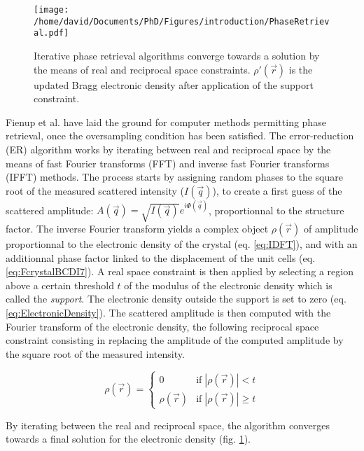 \begin{figure}[!htb]
   \centering
   \texttt{[image: /home/david/Documents/PhD/Figures/introduction/PhaseRetrieval.pdf]}
   \caption{
   Iterative phase retrieval algorithms converge towards a solution by the means of real and reciprocal space constraints.
   $\rho'(\vec{r})$ is the updated Bragg electronic density after application of the support constraint.
   }
   \label{fig:PRAlgo}
\end{figure}

Fienup et al. \parencite*{Fienup1978, Fienup1982, Fienup1986} have laid the ground for computer methods permitting phase retrieval, once the oversampling condition has been satisfied.
The error-reduction (ER) algorithm works by iterating between real and reciprocal space by the means of fast Fourier transforms (FFT) and inverse fast Fourier transforms (IFFT) methods.
The process starts by assigning random phases to the square root of the measured scattered intensity ($I(\vec{q})$), to create a first guess of the scattered amplitude: $A(\vec{q}) = \sqrt{I(\vec{q})}e^{i\Phi(\vec{q})}$, proportionnal to the structure factor.
The inverse Fourier transform yields a complex object $\rho(\vec{r})$ of amplitude proportionnal to the electronic density of the crystal (eq. \ref{eq:IDFT}), and with an additionnal phase factor linked to the displacement of the unit cells (eq. \ref{eq:FcrystalBCDI7}).
A real space constraint is then applied by selecting a region above a certain threshold $t$ of the modulus of the electronic density which is called the \textit{support}.
The electronic density outside the support is set to zero (eq. \ref{eq:ElectronicDensity}).
The scattered amplitude is then computed with the Fourier transform of the electronic density, the following reciprocal space constraint consisting in replacing the amplitude of the computed amplitude by the square root of the measured intensity.

\begin{equation}
    \label{eq:ElectronicDensity}
    \rho(\vec{r}) =
        \begin{cases}
            0  & \text{if} \; |\rho(\vec{r})| < t \\
            \rho(\vec{r}) & \text{if}  \; |\rho(\vec{r})| \geq t
        \end{cases}
\end{equation}

By iterating between the real and reciprocal space, the algorithm converges towards a final solution for the electronic density (fig. \ref{fig:PRAlgo}).

